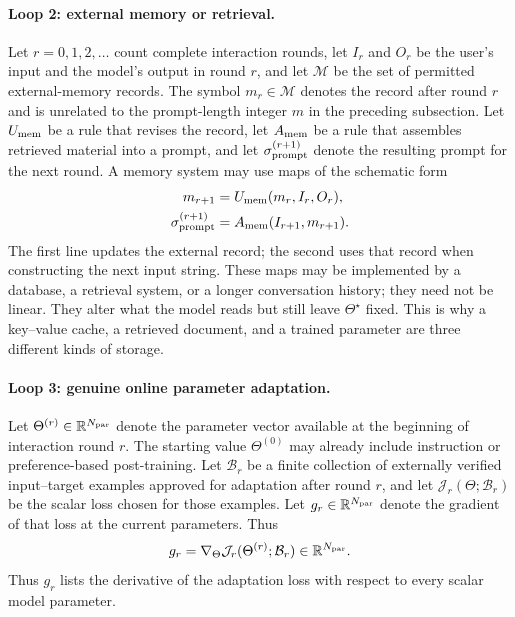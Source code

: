 \documentclass[
  aps,
  reprint,
  superscriptaddress,
  floatfix,
  nofootinbib,
  longbibliography
]{revtex4-2}
\newcommand{\R}{\mathbb{R}}
\begin{document}
\paragraph{Loop 2: external memory or retrieval.}
Let $r=0,1,2,\ldots$ count complete interaction rounds, let $I_r$ and $O_r$ be
the user's input and the model's output in round $r$, and let $\mathcal M$ be
the set of permitted external-memory records.  The symbol $m_r\in\mathcal M$
denotes the record after round $r$ and is unrelated to the prompt-length integer
$m$ in the preceding subsection.  Let $U_{\rm mem}$ be a rule that revises the
record, let $A_{\rm mem}$ be a rule that assembles retrieved material into a
prompt, and let $\sigma_{\rm prompt}^{(r+1)}$ denote the resulting prompt for
the next round.  A memory system may use maps of the schematic form
\begin{equation}
\label{eq:app-memory-update}
\begin{aligned}
m_{r+1}&=U_{\rm mem}(m_r,I_r,O_r),\\
\sigma_{\rm prompt}^{(r+1)}
&=A_{\rm mem}(I_{r+1},m_{r+1}).
\end{aligned}
\end{equation}
The first line updates the external record; the second uses that record when
constructing the next input string.  These maps may be implemented by a
database, a retrieval system, or a longer conversation history; they need not
be linear.  They alter what the model reads but still leave $\Theta^\star$
fixed.  This is why a key--value cache, a retrieved document, and a trained
parameter are three different kinds of storage.

\paragraph{Loop 3: genuine online parameter adaptation.}
Let $\Theta^{(r)}\in\R^{N_{\rm par}}$ denote the parameter vector available at
the beginning of interaction round $r$.  The starting value $\Theta^{(0)}$ may
already include instruction or preference-based post-training.  Let
$\mathcal B_r$ be a finite collection of externally verified input--target
examples approved for adaptation after round $r$, and let
$\mathcal J_r(\Theta;\mathcal B_r)$ be the scalar loss chosen for those
examples.  Let $g_r\in\R^{N_{\rm par}}$ denote the gradient of that loss at the
current parameters.  Thus
\begin{equation}
\label{eq:app-online-gradient}
g_r=\nabla_\Theta
\mathcal J_r(\Theta^{(r)};\mathcal B_r)
\in\R^{N_{\rm par}}.
\end{equation}
Thus $g_r$ lists the derivative of the adaptation loss with respect to every
scalar model parameter.
\end{document}
